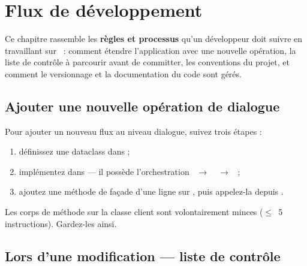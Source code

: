 \chapter{Flux de développement}
\label{chap-dev-workflow}

\renewcommand{\headrulewidth}{0.3pt}
\fancyhead[LE]{\thepage} \fancyhead[RE]{\nouppercase{\textbf{\leftmark}}}
\fancyhead[RO]{\thepage} \fancyhead[LO]{\nouppercase{\textbf{\rightmark}}}
\fancyfoot[L,C,R]{}

\setlength{\parindent}{0.35cm}

\minitoc

Ce chapitre rassemble les \textbf{règles et processus} qu'un développeur doit suivre en travaillant sur \cwv~: comment étendre l'application avec une nouvelle opération, la liste de contrôle à parcourir avant de committer, les conventions du projet, et comment le versionnage et la documentation du code sont gérés.

\section{Ajouter une nouvelle opération de dialogue}
\label{sec-dev-add-op}

Pour ajouter un nouveau flux au niveau dialogue, suivez trois étapes :

\begin{enumerate}
    \item définissez une dataclass  dans  ;
    \item implémentez  dans  --- il possède l'orchestration ~$\rightarrow$~~$\rightarrow$~ ;
    \item ajoutez une méthode de façade d'une ligne sur , puis appelez-la depuis .
\end{enumerate}

Les corps de méthode sur la classe client sont volontairement minces ($\leq$~5 instructions). Gardez-les ainsi.

\section{Lors d'une modification --- liste de contrôle}
\label{sec-dev-checklist}

